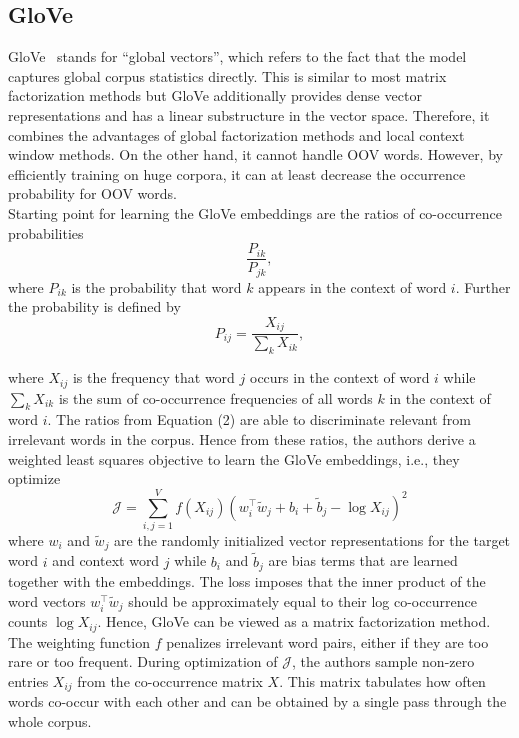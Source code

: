 \documentclass[11pt, a4paper]{amsart}
\begin{document}
\subsection{GloVe}

GloVe~\cite{pennington-etal-2014-glove} stands for ``global vectors'', which refers to the fact that the model captures global corpus statistics directly. 
This is similar to most matrix factorization methods but GloVe additionally provides dense vector representations and has a linear substructure in the vector space. 
Therefore, it combines the advantages of global factorization methods and local context window methods. 
On the other hand, it cannot handle OOV words. However, by efficiently training on huge corpora, it can at least decrease the occurrence probability for OOV words. \\

Starting point for learning the GloVe embeddings are the ratios of co-occurrence probabilities
\begin{equation}
	\frac{P_{ik}}{P_{jk}},
\end{equation}
where $P_{ik}$ is the probability that word $k$ appears in the context of word $i$. Further the probability is defined by
\begin{equation}
	P_{ij} = \frac{X_{ij}}{\sum_{k} X_{ik}},
\end{equation}

where $X_{ij}$ is the frequency that word $j$ occurs in the context of word $i$ while $\sum_{k} X_{ik}$ is the sum of co-occurrence frequencies of all words $k$ in the context of word $i$.
The ratios from Equation (2) are able to discriminate relevant from irrelevant words in the corpus. Hence from these ratios, the authors derive a weighted least squares objective to learn the GloVe embeddings, i.e., they optimize
\begin{equation}
	\mathcal{J} = \sum_{i,j = 1}^V f(X_{ij})(w_i^\top\widetilde{w}_j + b_i + \widetilde{b}_j - \log X_{ij})^2
\end{equation}
where $w_i$ and $\widetilde{w}_j$ are the randomly initialized vector representations for the target word $i$ and context word $j$ while $b_i$ and $\tilde{b}_j$ are bias terms that are learned together with the embeddings. The loss imposes that the inner product of the word vectors $w_i^\top\widetilde{w}_j$ should be approximately equal to their log co-occurrence counts $\log X_{ij}$. Hence, GloVe can be viewed as a matrix factorization method. The weighting function $f$ penalizes irrelevant word pairs, either if they are too rare or too frequent. During optimization of $\mathcal{J}$, the authors sample non-zero entries $X_{ij}$ from the co-occurrence matrix $X$. This matrix tabulates how often words co-occur with each other and can be obtained by a single pass through the whole corpus.\\
\end{document}
